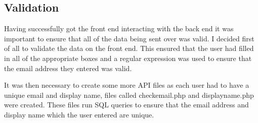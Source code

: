 \subsection{Validation}
Having successfully got the front end interacting with the back end it was important to ensure that all of the data being sent over was valid. I decided first of all to validate the data on the front end. This ensured that the user had filled in all of the appropriate boxes and a regular expression was used to ensure that the email address they entered was valid.

It was then necessary to create some more API files as each user had to have a unique email and display name, files called checkemail.php and displayname.php were created. These files run SQL queries to ensure that the email address and display name which the user entered are unique.


